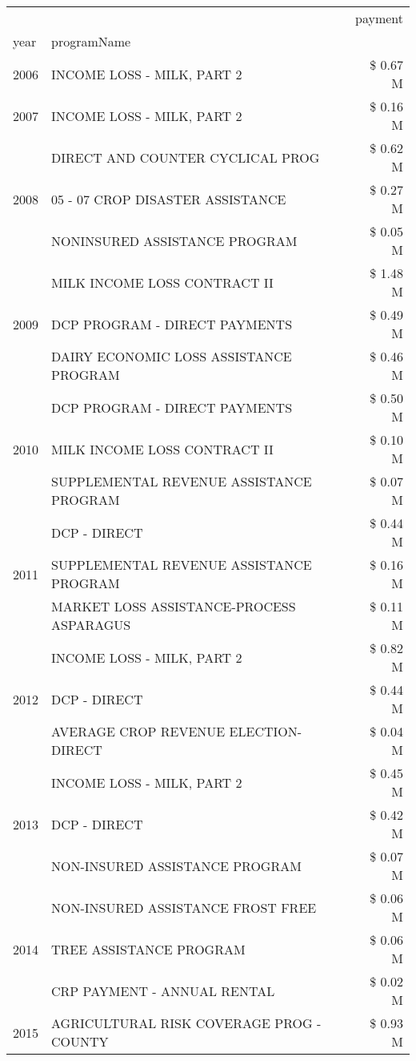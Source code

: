 \begin{tabular}{llr}
\toprule
 &  & payment \\
year & programName &  \\
\midrule
2006 & INCOME LOSS - MILK, PART 2 & \$ 0.67 M \\
\cline{1-3}
2007 & INCOME LOSS - MILK, PART 2 & \$ 0.16 M \\
\cline{1-3}
\multirow[t]{3}{*}{2008} & DIRECT AND COUNTER CYCLICAL PROG & \$ 0.62 M \\
 & 05 - 07 CROP DISASTER ASSISTANCE & \$ 0.27 M \\
 & NONINSURED ASSISTANCE PROGRAM & \$ 0.05 M \\
\cline{1-3}
\multirow[t]{3}{*}{2009} & MILK INCOME LOSS CONTRACT II & \$ 1.48 M \\
 & DCP PROGRAM - DIRECT PAYMENTS & \$ 0.49 M \\
 & DAIRY ECONOMIC LOSS ASSISTANCE PROGRAM & \$ 0.46 M \\
\cline{1-3}
\multirow[t]{3}{*}{2010} & DCP PROGRAM - DIRECT PAYMENTS & \$ 0.50 M \\
 & MILK INCOME LOSS CONTRACT II & \$ 0.10 M \\
 & SUPPLEMENTAL REVENUE ASSISTANCE PROGRAM & \$ 0.07 M \\
\cline{1-3}
\multirow[t]{3}{*}{2011} & DCP - DIRECT & \$ 0.44 M \\
 & SUPPLEMENTAL REVENUE ASSISTANCE PROGRAM & \$ 0.16 M \\
 & MARKET LOSS ASSISTANCE-PROCESS ASPARAGUS & \$ 0.11 M \\
\cline{1-3}
\multirow[t]{3}{*}{2012} & INCOME LOSS - MILK, PART 2 & \$ 0.82 M \\
 & DCP - DIRECT & \$ 0.44 M \\
 & AVERAGE CROP REVENUE ELECTION-DIRECT & \$ 0.04 M \\
\cline{1-3}
\multirow[t]{3}{*}{2013} & INCOME LOSS - MILK, PART 2 & \$ 0.45 M \\
 & DCP - DIRECT & \$ 0.42 M \\
 & NON-INSURED ASSISTANCE PROGRAM & \$ 0.07 M \\
\cline{1-3}
\multirow[t]{3}{*}{2014} & NON-INSURED ASSISTANCE FROST FREE & \$ 0.06 M \\
 & TREE ASSISTANCE PROGRAM & \$ 0.06 M \\
 & CRP PAYMENT - ANNUAL RENTAL & \$ 0.02 M \\
\cline{1-3}
\multirow[t]{3}{*}{2015} & AGRICULTURAL RISK COVERAGE PROG - COUNTY & \$ 0.93 M \\

\end{tabular}
